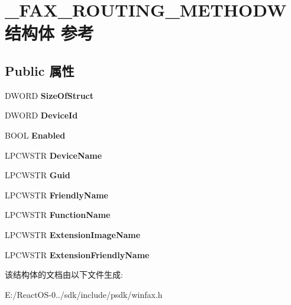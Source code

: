 \hypertarget{struct___f_a_x___r_o_u_t_i_n_g___m_e_t_h_o_d_w}{}\section{\+\_\+\+F\+A\+X\+\_\+\+R\+O\+U\+T\+I\+N\+G\+\_\+\+M\+E\+T\+H\+O\+D\+W结构体 参考}
\label{struct___f_a_x___r_o_u_t_i_n_g___m_e_t_h_o_d_w}
\subsection*{Public 属性}
\begin{DoxyCompactItemize}
\item 
\mbox{\label{struct___f_a_x___r_o_u_t_i_n_g___m_e_t_h_o_d_w_a1fcb93cbe2b7d3ef1e2503f31bcd7c10}} 
D\+W\+O\+RD {\bfseries Size\+Of\+Struct}
\item 
\mbox{\label{struct___f_a_x___r_o_u_t_i_n_g___m_e_t_h_o_d_w_a3569842fd828e916b170350e450c8319}} 
D\+W\+O\+RD {\bfseries Device\+Id}
\item 
\mbox{\label{struct___f_a_x___r_o_u_t_i_n_g___m_e_t_h_o_d_w_a013402da342b1e587cfc6d80a84640b6}} 
B\+O\+OL {\bfseries Enabled}
\item 
\mbox{\label{struct___f_a_x___r_o_u_t_i_n_g___m_e_t_h_o_d_w_ab3b07c68bb24924e1528e0ee1b489605}} 
L\+P\+C\+W\+S\+TR {\bfseries Device\+Name}
\item 
\mbox{\label{struct___f_a_x___r_o_u_t_i_n_g___m_e_t_h_o_d_w_a6cf6ed06c8f865b8d485c2adc6d7d473}} 
L\+P\+C\+W\+S\+TR {\bfseries Guid}
\item 
\mbox{\label{struct___f_a_x___r_o_u_t_i_n_g___m_e_t_h_o_d_w_ac9d8365be830386fd29671f48bf7b33a}} 
L\+P\+C\+W\+S\+TR {\bfseries Friendly\+Name}
\item 
\mbox{\label{struct___f_a_x___r_o_u_t_i_n_g___m_e_t_h_o_d_w_a109ec77137722cdd50a3586dcce345b1}} 
L\+P\+C\+W\+S\+TR {\bfseries Function\+Name}
\item 
\mbox{\label{struct___f_a_x___r_o_u_t_i_n_g___m_e_t_h_o_d_w_a5c3e7538fef6095dd6807e8a58427be0}} 
L\+P\+C\+W\+S\+TR {\bfseries Extension\+Image\+Name}
\item 
\mbox{\label{struct___f_a_x___r_o_u_t_i_n_g___m_e_t_h_o_d_w_acf5e8006e0d09b3cfac78bdab43057a6}} 
L\+P\+C\+W\+S\+TR {\bfseries Extension\+Friendly\+Name}
\end{DoxyCompactItemize}


该结构体的文档由以下文件生成\+:\begin{DoxyCompactItemize}
\item 
E\+:/\+React\+O\+S-\/0../sdk/include/psdk/winfax.\+h\end{DoxyCompactItemize}
